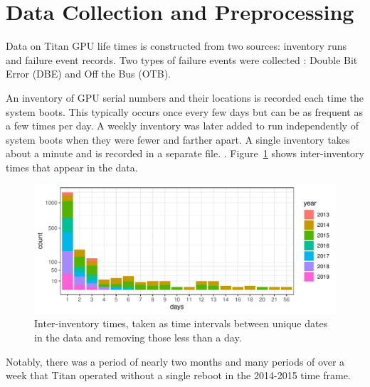 \section{Data Collection and Preprocessing}
\label{section:dataprep}
Data on Titan GPU life times is constructed from two sources:
inventory runs and failure event  records. Two types of
failure events were collected : Double Bit Error
(DBE) and Off the Bus (OTB). 

An inventory of GPU serial numbers and their locations is recorded
each time the system boots. This typically occurs once every few days
but can be as frequent as a few times per day. A weekly inventory was
later added to run independently of system boots when they were fewer
and farther apart. A single inventory takes about a minute and is
recorded in a separate file. .
Figure~\ref{fig:inventory} shows inter-inventory times that appear in
the data.
\begin{figure}[bt]
  \begin{center}
    \includegraphics[width=\columnwidth]{figs/attention_intervals001.pdf}
  \end{center}
  \caption{Inter-inventory times, taken as time intervals between
    unique dates in the data and removing those less than a day.}
  \label{fig:inventory}
\end{figure}
Notably, there was a period of nearly two months and many periods of
over a week that Titan operated without a single reboot in the
2014-2015 time frame. 

